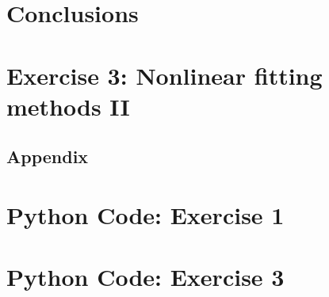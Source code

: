 \documentclass[letterpaper,12pt]{article}
\begin{document}
\section{Conclusions}

\pagebreak

\section*{Exercise 3:  Nonlinear fitting methods II}

\pagebreak

\begin{center}
  \section*{Appendix}
\end{center}

\section*{Python Code: Exercise 1}



\pagebreak

\section*{Python Code: Exercise 3}



\pagebreak

\begin{thebibliography}{99}


\end{thebibliography}
\end{document}
